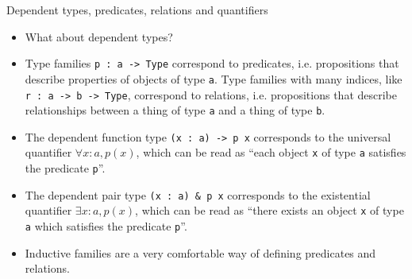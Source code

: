 \documentclass{beamer}
\newcommand{\m}[1]{\texttt{#1}}
\begin{document}
\begin{frame}{Dependent types, predicates, relations and quantifiers}
\begin{itemize}
	\item What about dependent types?
	\item Type families \m{p :\ a -> Type} correspond to predicates, i.e. propositions that describe properties of objects of type \m{a}. Type families with many indices, like \m{r :\ a -> b -> Type}, correspond to relations, i.e. propositions that describe relationships between a thing of type \m{a} and a thing of type \m{b}.
	\item The dependent function type \m{(x :\ a) -> p x} corresponds to the universal quantifier $\forall x : a, p(x)$, which can be read as ``each object \m{x} of type \m{a} satisfies the predicate \m{p}''.
	\item The dependent pair type \m{(x :\ a) \& p x} corresponds to the existential quantifier $\exists x : a, p(x)$, which can be read as ``there exists an object \m{x} of type \m{a} which satisfies the predicate \m{p}''.
	\item Inductive families are a very comfortable way of defining predicates and relations.
\end{itemize}
\end{frame}
\end{document}
